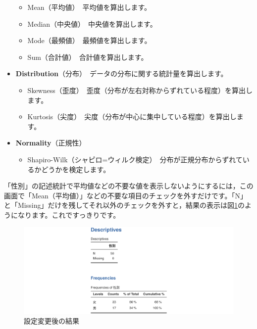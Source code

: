 \documentclass[
  12pt,
  a5jpaper,
  lualatex, ja=standard]{bxjsbook}
\providecommand{\tightlist}{%
  \setlength{\itemsep}{0pt}\setlength{\parskip}{0pt}}
\newenvironment{jmvsettings}{%
	\begin{center}%
	\begin{tcolorbox}[%
		title=設定項目,
		colframe=gmoji,
		colbacktitle=gmoji,
		colback=gmoji!2!white,
		breakable,
		width=.9\textwidth,
		]\small\addtolength{\leftmargini}{-3\labelsep}%
	}%
	{\end{tcolorbox}\end{center}}
\begin{document}
\begin{jmvsettings}
\begin{itemize}
  \begin{itemize}
  \tightlist
  \item
    Mean（平均値）　平均値を算出します。
  \item
    Median（中央値）　中央値を算出します。
  \item
    Mode（最頻値）　最頻値を算出します。
  \item
    Sum（合計値）　合計値を算出します。
  \end{itemize}
\item
  \textbf{Distribution}（分布）　データの分布に関する統計量を算出します。

  \begin{itemize}
  \tightlist
  \item
    Skewness（歪度）　歪度（分布が左右対称からずれている程度）を算出します。
  \item
    Kurtosis（尖度）　尖度（分布が中心に集中している程度）を算出します。
  \end{itemize}
\item
  \textbf{Normality}（正規性）

  \begin{itemize}
  \tightlist
  \item
    Shapiro-Wilk（シャピロ=ウィルク検定）　分布が正規分布からずれているかどうかを検定します。
  \end{itemize}
\end{itemize}

\end{jmvsettings}

「性別」の記述統計で平均値などの不要な値を表示しないようにするには，この画面で「Mean（平均値）」などの不要な項目のチェックを外すだけです。「N」と「Missing」だけを残してそれ以外のチェックを外すと，結果の表示は図\ref{fig:Exploration-descriptives-seibetsu-table3}のようになります。これですっきりです。

\begin{figure}[!ht]

{\centering \includegraphics[width=1\linewidth]{images/exploration/Exploration-descriptives-seibetsu-table3} 

}

\caption{設定変更後の結果}\label{fig:Exploration-descriptives-seibetsu-table3}
\end{figure}
\end{document}
